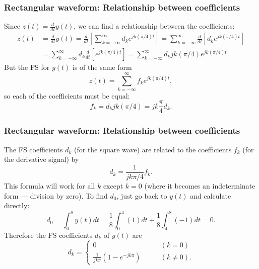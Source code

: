 \documentclass[10pt]{beamer}
\begin{document}
\begin{frame}
\frametitle{Rectangular waveform:  Relationship between coefficients}

Since $z(t) = \frac{d}{dt} y(t)$, we can find a relationship between
the coefficients:
\begin{align*}
  z(t) &= \frac{d}{dt} y(t) = \frac{d}{dt} \left[
  \sum_{k=-\infty}^\infty d_k e^{j k (\pi/4) t} \right] 
  = \sum_{k=-\infty}^\infty \frac{d}{dt} \left[
  d_k e^{j k (\pi/4) t} \right] \\
  &= \sum_{k=-\infty}^\infty d_k \frac{d}{dt} \left[
  e^{j k (\pi/4) t} \right]
  = \sum_{k=-\infty}^\infty d_k j k (\pi/4) e^{j k (\pi/4) t}.
\end{align*}
But the FS for $y(t)$ is of the same form
\begin{equation*}
  z(t) = \sum_{k=-\infty}^\infty f_k e^{j k (\pi/4) t},
\end{equation*}
so each of the coefficients must be equal:
\begin{equation*}
  f_k = d_k j k (\pi/4) = j k \frac{\pi}{4} d_k.
\end{equation*}
\end{frame}

\begin{frame}
\frametitle<presentation>{Rectangular waveform:  Relationship between coefficients}
The FS coefficients $d_k$ (for the square wave) are related to the
coefficients $f_k$ (for the derivative signal) by
\begin{equation*}
  d_k = \frac{1}{j k \pi/4} f_k.
\end{equation*}
This formula will work for all $k$ except $k=0$ (where it becomes an indeterminate 
form --- division by zero).  
To find $d_0$, just go back to $y(t)$ and calculate directly:
\begin{equation*}
  d_0 = \int_0^8 y(t) dt = 
  \frac{1}{8} \int_0^4 (1) dt + \frac{1}{8} \int_4^8 (-1) dt = 0.
\end{equation*}
Therefore the FS coefficients $d_k$ of $y(t)$ are
\begin{equation*}
  d_k = \begin{cases}
  0 \qquad & (k=0) \\
  \frac{1}{j k \pi} (1 - e^{-j k \pi}) \qquad & (k \neq 0).
  \end{cases}
\end{equation*}
\end{frame}
\end{document}
